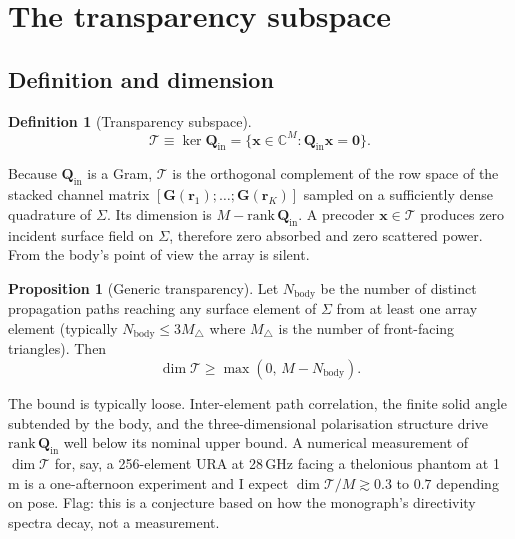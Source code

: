 \documentclass[11pt,a4paper]{article}
\theoremstyle{definition}
\newtheorem{proposition}[proposition]{Proposition}
\newtheorem{definition}[definition]{Definition}
\newcommand{\rr}{\mathbf{r}}
\newcommand{\Complex}{\mathbb{C}}
\newcommand{\Qinn}{\mathbf{Q}_{\mathrm{in}}}
\begin{document}
\section{The transparency subspace}

\subsection{Definition and dimension}

\begin{definition}[Transparency subspace]
\begin{equation}
  \mathcal{T}\equiv\ker\Qinn=
  \{\mathbf{x}\in\Complex^M:\Qinn\mathbf{x}=\mathbf{0}\}.
\end{equation}
\end{definition}

Because $\Qinn$ is a Gram, $\mathcal{T}$ is the orthogonal
complement of the row space of the stacked channel matrix
$[\mathbf{G}(\rr_1);\ldots;\mathbf{G}(\rr_K)]$ sampled on a
sufficiently dense quadrature of $\Sigma$.  Its dimension is
$M-\mathrm{rank}\,\Qinn$.  A precoder $\mathbf{x}\in\mathcal{T}$
produces zero incident surface field on $\Sigma$, therefore zero
absorbed and zero scattered power.  From the body's point of view
the array is silent.

\begin{proposition}[Generic transparency]\label{prop:dim}
Let $N_{\mathrm{body}}$ be the number of distinct propagation paths
reaching any surface element of $\Sigma$ from at least one array
element (typically $N_{\mathrm{body}}\le 3M_\triangle$ where
$M_\triangle$ is the number of front-facing triangles).  Then
\begin{equation}\label{eq:dim}
  \dim\mathcal{T}\ge\max(0,\,M-N_{\mathrm{body}}).
\end{equation}
\end{proposition}

The bound is typically loose.  Inter-element path correlation, the
finite solid angle subtended by the body, and the three-dimensional
polarisation structure drive $\mathrm{rank}\,\Qinn$ well below its
nominal upper bound.  A numerical measurement of $\dim\mathcal{T}$
for, say, a 256-element URA at 28\,GHz facing a thelonious phantom
at 1\,m is a one-afternoon experiment and I expect
$\dim\mathcal{T}/M\gtrsim 0.3$ to $0.7$ depending on pose.  Flag:
this is a conjecture based on how the monograph's directivity spectra
decay, not a measurement.
\end{document}
